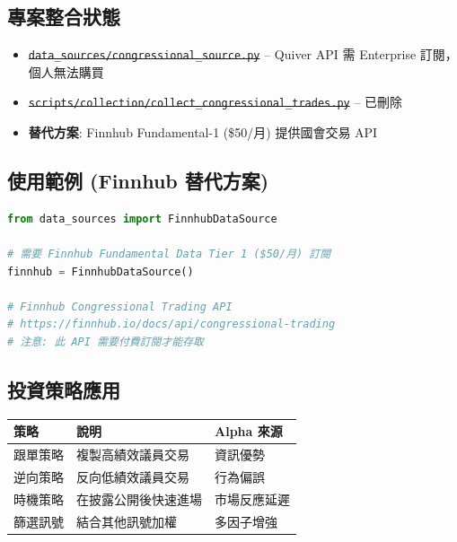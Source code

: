 \documentclass[11pt,a4paper]{article}
\begin{document}
\subsection*{專案整合狀態}

\begin{tcolorbox}[colback=warningyellow!10,colframe=warningyellow,title={\textbf{已移除 (2026-01-10)}}]
\begin{itemize}[leftmargin=*]
    \item \sout{\texttt{data\_sources/congressional\_source.py}} -- Quiver API 需 Enterprise 訂閱，個人無法購買
    \item \sout{\texttt{scripts/collection/collect\_congressional\_trades.py}} -- 已刪除
    \item \textbf{替代方案}: Finnhub Fundamental-1 (\$50/月) 提供國會交易 API
\end{itemize}
\end{tcolorbox}

\subsection*{使用範例 (Finnhub 替代方案)}

\begin{lstlisting}[language=Python,caption={使用 Finnhub 獲取國會交易 (需 Fundamental-1 訂閱)}]
from data_sources import FinnhubDataSource

# 需要 Finnhub Fundamental Data Tier 1 ($50/月) 訂閱
finnhub = FinnhubDataSource()

# Finnhub Congressional Trading API
# https://finnhub.io/docs/api/congressional-trading
# 注意: 此 API 需要付費訂閱才能存取
\end{lstlisting}

\subsection*{投資策略應用}

\begin{table}[H]
\centering
\begin{tabular}{@{}lll@{}}
\toprule
\textbf{策略} & \textbf{說明} & \textbf{Alpha 來源} \\
\midrule
跟單策略 & 複製高績效議員交易 & 資訊優勢 \\
逆向策略 & 反向低績效議員交易 & 行為偏誤 \\
時機策略 & 在披露公開後快速進場 & 市場反應延遲 \\
篩選訊號 & 結合其他訊號加權 & 多因子增強 \\
\bottomrule
\end{tabular}
\end{table}
\end{document}
